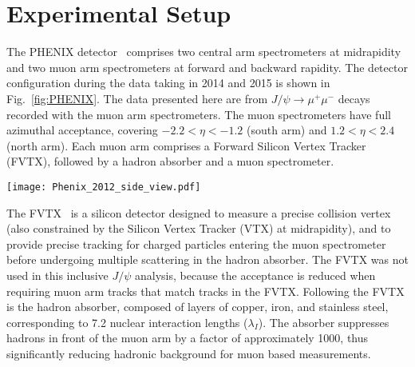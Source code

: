 \documentclass[twocolumn,letterpaper,aps,prc,longbibliography,superscriptaddress,nofootinbib,floatfix]{revtex4-1}
\newcommand{\jpsi}{\mbox{$J/\psi$}\xspace}
\begin{document}
\section{Experimental Setup}
\label{sec:experiment}

The PHENIX detector~\cite{Adcox:2003zm} comprises two central arm 
spectrometers at midrapidity and two muon arm spectrometers at forward 
and backward rapidity.  The detector configuration during the data 
taking in 2014 and 2015 is shown in Fig.~\ref{fig:PHENIX}. The data 
presented here are from $J/\psi \rightarrow \mu^+ \mu^-$ decays recorded 
with the muon arm spectrometers. The muon spectrometers have full 
azimuthal acceptance, covering $-2.2<\eta<-1.2$ (south arm) and 
$1.2<\eta<2.4$ (north arm). Each muon arm comprises a Forward Silicon 
Vertex Tracker (FVTX), followed by a hadron absorber and a muon 
spectrometer.

\begin{figure*}[th]
\texttt{[image: Phenix\_2012\_side\_view.pdf]}
\caption{\label{fig:PHENIX}
Side view of the PHENIX detector in 2014 and 2015.}
\end{figure*}

The FVTX~\cite{Aidala:2013vna} is a silicon detector designed to measure 
a precise collision vertex (also constrained by the Silicon Vertex 
Tracker (VTX) at midrapidity), and to provide precise tracking for 
charged particles entering the muon spectrometer before undergoing 
multiple scattering in the hadron absorber. The FVTX was not used in 
this inclusive \jpsi analysis, because the acceptance is reduced when 
requiring muon arm tracks that match tracks in the FVTX. Following the 
FVTX is the hadron absorber, composed of layers of copper, iron, and 
stainless steel, corresponding to 7.2 nuclear interaction lengths 
($\lambda_{I}$).  The absorber suppresses hadrons in front of the muon 
arm by a factor of approximately 1000, thus significantly reducing 
hadronic background for muon based measurements.
\end{document}
